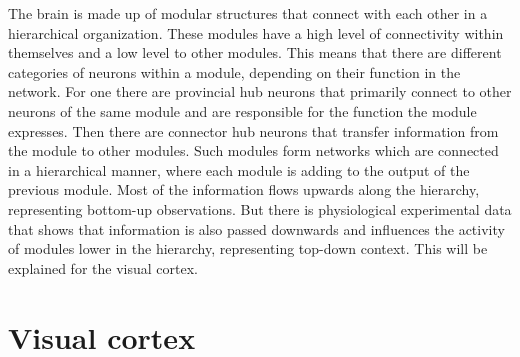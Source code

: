 The brain is made up of modular structures that connect with each other in a hierarchical organization. These modules have a high level of connectivity within themselves and a low level to other modules. This means that there are different categories of neurons within a module, depending on their function in the network. For one there are provincial hub neurons that primarily connect to other neurons of the same module and are responsible for the function the module expresses. Then there are connector hub neurons that transfer information from the module to other modules. Such modules form networks which are connected in a hierarchical manner, where each module is adding to the output of the previous module. \citep{hierarchicalBrain}
Most of the information flows upwards along the hierarchy, representing bottom-up observations. But there is physiological experimental data that shows that information is also passed downwards and influences the activity of modules lower in the hierarchy, representing top-down context. This will be explained for the visual cortex.

\section{Visual cortex}

